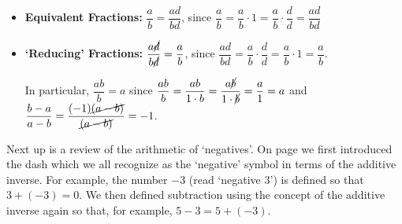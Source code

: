 {\begin{itemize}

\item  \textbf{Equivalent Fractions:}  $\dfrac{a}{b} = \dfrac{ad}{bd}$, since $ \dfrac{a}{b} = \dfrac{a}{b} \cdot 1 = \dfrac{a}{b} \cdot \dfrac{d}{d} = \dfrac{ad}{bd}$


\item  \textbf{`Reducing' Fractions:} $\dfrac{a\cancel{d}}{b\cancel{d}} = \dfrac{a}{b}$, since  $\dfrac{ad}{bd} = \dfrac{a}{b} \cdot \dfrac{d}{d} = \dfrac{a}{b} \cdot 1 = \dfrac{a}{b}$.

In particular, $\dfrac{ab}{b} = a$ since $\dfrac{ab}{b} = \dfrac{ab}{1 \cdot b} =  \dfrac{a \cancel{b}}{1 \cdot \cancel{b}} = \dfrac{a}{1} = a$ and $\dfrac{b-a}{a-b} = \dfrac{(-1)\cancel{(a-b)}}{\cancel{(a-b)}} = -1$.

\end{itemize}
}

\medskip


Next up is a review of the arithmetic of `negatives'. On page \pageref{realnumberaddition} we first introduced the dash which we all recognize as the `negative' symbol in terms of the additive inverse.  For example, the number $-3$ (read `negative $3$') is defined so that $3 + (-3) = 0$.  We then defined subtraction using the concept of the additive inverse again so that, for example, $5 - 3 = 5 + (-3)$.  



\medskip

